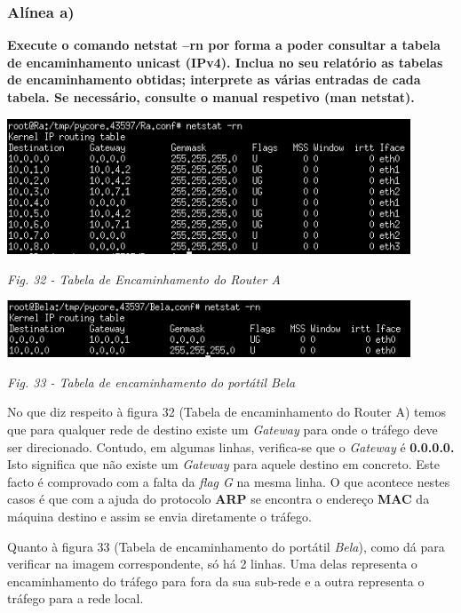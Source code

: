 \documentclass{article}
\begin{document}
\subsubsection{Alínea a)}
\textbf{Execute o comando netstat –rn por forma a poder consultar a tabela de encaminhamento unicast (IPv4). Inclua
no seu relatório as tabelas de encaminhamento obtidas; interprete as várias entradas de cada tabela. Se
necessário, consulte o manual respetivo (man netstat).}\vspace{0.35cm}
\begin{center}
    \includegraphics[width=12cm]{12.png}\par\caption{\textit{Fig. 32 - Tabela de Encaminhamento do Router A}}
\end{center}
\begin{center}
    \includegraphics[width = 12cm]{123.png}\par\caption{\textit{Fig. 33 - Tabela de encaminhamento do portátil Bela}}
\end{center}

\hspace{0.5cm}No que diz respeito à figura 32 (Tabela de encaminhamento do Router A) temos que para
qualquer rede de destino existe um \textit{Gateway} para onde o tráfego deve ser direcionado. Contudo, em algumas linhas, verifica-se que o \textit{Gateway} é \textbf{0.0.0.0.} 
Isto significa que não existe um \textit{Gateway} para aquele destino em concreto. Este facto é comprovado com a falta da \textit{flag G} na mesma linha. O que acontece nestes casos é que com a ajuda do protocolo \textbf{ARP} se encontra o endereço
\textbf{MAC} da máquina destino e assim se envia diretamente o tráfego.

\hspace{0.5cm}Quanto à figura 33 (Tabela de encaminhamento do portátil \textit{Bela}), como dá para verificar na imagem correspondente, só há 2 linhas.
Uma delas representa o encaminhamento do tráfego para fora da sua sub-rede e
a outra representa o tráfego para a rede local.\clearpage
\end{document}

